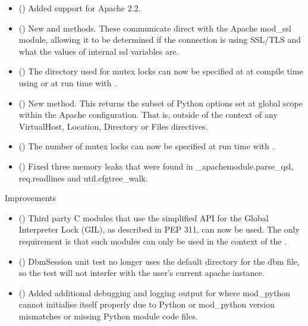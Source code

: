   \begin{itemize}
    \item
      ()
      Added support for Apache 2.2.
    \item
      ()
      New  and  methods.
      These communicate direct with the Apache mod_ssl module, allowing
      it to be determined if the connection is using SSL/TLS and what the
      values of internal ssl variables are.
    \item
      ()
      The directory used for mutex locks can now be specified at 
      at compile time using 
      or at run time with .
    \item
      ()
      New  method. This returns the subset
      of Python options set at global scope within the Apache configuration.
      That is, outside of the context of any VirtualHost, Location, Directory
      or Files directives.
    \item
      ()
      The number of mutex locks can now be specified at run time with
      .
    \item
     ()
      Fixed three memory leaks that were found in _apachemodule.parse_qsl, req.readlines
      and util.cfgtree_walk.
  \end{itemize}

  Improvements

  \begin{itemize}
    \item
      ()
      Third party C modules that use the simplified API for the Global
      Interpreter Lock (GIL), as described in PEP 311, can now be used. The
      only requirement is that such modules can only be used in the context
      of the .
    \item
      ()
      DbmSession unit test no longer uses the default directory for the dbm file,
      so the test will not interfer with the user's current apache instance.
    \item
      ()
      Added additional debugging and logging output for where mod_python
      cannot initialise itself properly due to Python or mod_python version
      mismatches or missing Python module code files.
  \end{itemize}

